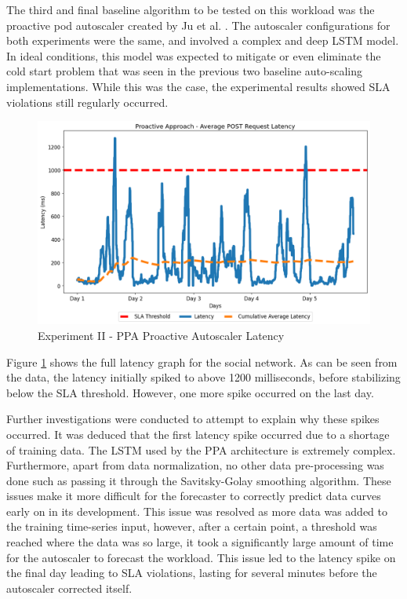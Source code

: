 The third and final baseline algorithm to be tested on this workload was the proactive pod autoscaler created by Ju et al. \cite{ju2021proactive}. The autoscaler configurations for both experiments were the same, and involved a complex and deep LSTM model. In ideal conditions, this model was expected to mitigate or even eliminate the cold start problem that was seen in the previous two baseline auto-scaling implementations. While this was the case, the experimental results showed SLA violations still regularly occurred.\par

\begin{figure}[htb]
    \centering
    \caption{Experiment II - PPA Proactive Autoscaler Latency}
    \label{fig:exp2-proactive-k8s}
    \includegraphics[width=0.6\linewidth]{Figures/Compose-Post-Proactive-Latency.png}
\end{figure}

Figure \ref{fig:exp2-proactive-k8s} shows the full latency graph for the social network. As can be seen from the data, the latency initially spiked to above 1200 milliseconds, before stabilizing below the SLA threshold. However, one more spike occurred on the last day.\par

Further investigations were conducted to attempt to explain why these spikes occurred. It was deduced that the first latency spike occurred due to a shortage of training data. The LSTM used by the PPA architecture is extremely complex. Furthermore, apart from data normalization, no other data pre-processing was done such as passing it through the Savitsky-Golay smoothing algorithm. These issues make it more difficult for the forecaster to correctly predict data curves early on in its development. This issue was resolved as more data was added to the training time-series input, however, after a certain point, a threshold was reached where the data was so large, it took a significantly large amount of time for the autoscaler to forecast the workload. This issue led to the latency spike on the final day leading to SLA violations, lasting for several minutes before the autoscaler corrected itself.\par


